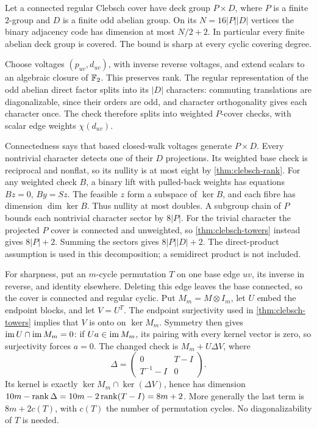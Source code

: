 \begin{theorem}\label{thm:clebsch-product}
\notformalized
Let a connected regular Clebsch cover have deck group $P\times D$,
where $P$ is a finite $2$-group and $D$ is a finite odd abelian group.
On its $N=16|P||D|$ vertices the binary adjacency code has dimension
at most $N/2+2$. In particular every finite abelian deck group is
covered. The bound is sharp at every cyclic covering degree.
\end{theorem}
\begin{informalproof}
Choose voltages $(p_{uv},d_{uv})$, with inverse reverse voltages, and
extend scalars to an algebraic closure of $\mathbb{F}_2$. This preserves rank.
The regular representation of the odd abelian direct factor splits
into its $|D|$ characters: commuting translations are diagonalizable,
since their orders are odd, and character orthogonality gives each
character once. The check therefore splits into weighted $P$-cover
checks, with scalar edge weights $\chi(d_{uv})$.

Connectedness says that based closed-walk voltages generate $P\times D$.
Every nontrivial character detects one of their $D$ projections. Its
weighted base check is reciprocal and nonflat, so its nullity is at
most eight by \cref{thm:clebsch-rank}. For any weighted check $B$,
a binary lift with pulled-back weights has equations $Bz=0$, $By=Sz$.
The feasible $z$ form a subspace of $\ker B$, and each fibre has
dimension $\dim\ker B$. Thus nullity at most doubles. A subgroup
chain of $P$ bounds each nontrivial character sector by $8|P|$.
For the trivial character the projected $P$ cover is connected and
unweighted, so \cref{thm:clebsch-towers} instead gives $8|P|+2$.
Summing the sectors gives $8|P||D|+2$. The direct-product assumption
is used in this decomposition; a semidirect product is not included.

For sharpness, put an $m$-cycle permutation $T$ on one base edge $uv$,
its inverse in reverse, and identity elsewhere. Deleting this edge
leaves the base connected, so the cover is connected and regular
cyclic. Put $M_m=M\otimes I_m$, let $U$ embed the endpoint blocks,
and let $V=U^T$. The endpoint surjectivity used in
\cref{thm:clebsch-towers} implies that $V$ is onto on $\ker M_m$.
Symmetry then gives $\operatorname{im} U\cap\operatorname{im} M_m=0$: if $Ua\in\operatorname{im} M_m$, its
pairing with every kernel vector is zero, so surjectivity forces $a=0$.
The changed check is $M_m+U\Delta V$, where
\[
 \Delta=\begin{pmatrix}0&T-I\\T^{-1}-I&0\end{pmatrix}.
\]
Its kernel is exactly $\ker M_m\cap\ker(\Delta V)$, hence has
dimension $10m-\operatorname{rank}\Delta=10m-2\operatorname{rank}(T-I)=8m+2$.
More generally the last term is $8m+2c(T)$, with $c(T)$ the number
of permutation cycles. No diagonalizability of $T$ is needed.
\end{informalproof}

